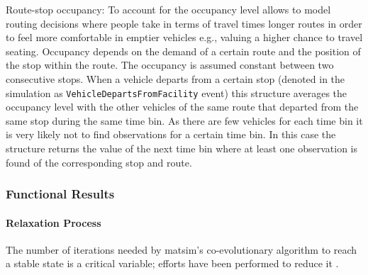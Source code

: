 \begin{compactitem}
%
\item Route-stop occupancy: To account for the occupancy level allows to model routing decisions where people take in terms of travel times longer routes in order to feel more comfortable in emptier vehicles e.g., valuing a higher chance to travel seating. Occupancy depends on the demand of a certain route and the position of the stop within the route. The occupancy is assumed constant between two consecutive stops. When a vehicle departs from a certain stop (denoted in the simulation as \lstinline|VehicleDepartsFromFacility| event) this structure averages the occupancy level with the other vehicles of the same route that departed from the same stop during the same time bin. As there are few vehicles for each time bin it is very likely not to find observations for a certain time bin. In this case the structure returns the value of the next time bin where at least one observation is found of the corresponding stop and route.
\end{compactitem}

\subsubsection{Functional Results}
\paragraph{Relaxation Process}

The number of iterations needed by \gls{matsim}'s co-evolutionary algorithm to reach a stable state is a critical variable; efforts have been performed to reduce it \citep{MeisterEtAl_STRC_2006, FourieEtAl_TRB_2013}.

